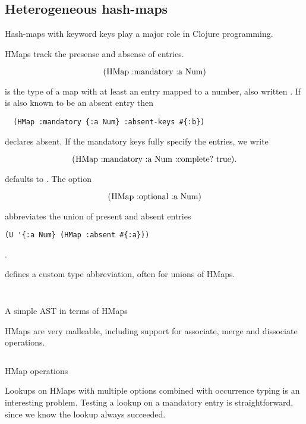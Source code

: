 \subsection{Heterogeneous hash-maps}

Hash-maps with keyword keys play a major role in Clojure programming.

HMaps track the presense and absense of entries.

$$
\clj{(HMap :mandatory {:a Num})} 
$$

is the type of a map with at least an  entry mapped to a number,
also written . If  is also known to be an absent entry
then

\smallskip
\begin{verbatim}
  (HMap :mandatory {:a Num} :absent-keys #{:b})
\end{verbatim}

declares  absent. If the mandatory keys fully specify the
entries, we write

$$
\clj{(HMap :mandatory {:a Num} :complete? true)}.
$$

 defaults to .
The  option 

$$
\clj{(HMap :optional {:a Num})}
$$

abbreviates the union of present and absent entries

\smallskip
\begin{verbatim}
(U '{:a Num} (HMap :absent #{:a}))
\end{verbatim}
.


 defines a custom type abbreviation, often for unions of HMaps.

\begin{listing}
\inputminted[firstline=5,lastline=8]{clojure}{code/demo/src/demo/hmap.clj}
\inputminted[firstline=26,lastline=28]{clojure}{code/demo/src/demo/hmap.clj}
\caption{A simple AST in terms of HMaps}
\end{listing}


HMaps are very malleable, including support for associate, merge and dissociate operations.

\begin{listing}
\inputminted[firstline=10,lastline=24]{clojure}{code/demo/src/demo/hmap.clj}
\caption{HMap operations}
\end{listing}

Lookups on HMaps with multiple options combined with
occurrence typing is an interesting problem.
Testing a lookup on a mandatory entry is straightforward, since we
know the lookup always succeeded.

